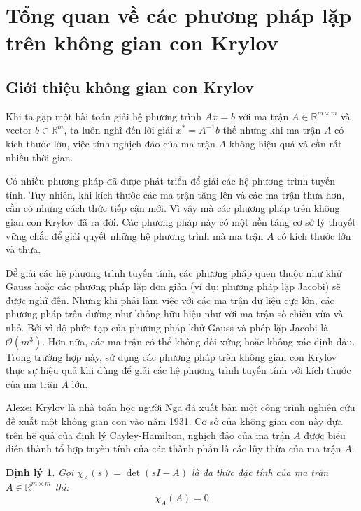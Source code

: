 \documentclass[14pt, a4paper]{article}
\numberwithin{equation}{section}
\numberwithin{algorithm}{section}
\numberwithin{figure}{section}
\newtheorem{dl}{Định lý}
\numberwithin{dl}{section}
\numberwithin{md}{section}
\numberwithin{bd}{section}
\numberwithin{dn}{section}
\numberwithin{hq}{section}
\begin{document}
\section{Tổng quan về các phương pháp lặp trên không gian con Krylov}

\subsection{Giới thiệu không gian con Krylov}

Khi ta gặp một bài toán giải hệ phương trình $Ax=b$ với ma trận $A \in \mathbb{R}^{m \times m}$ và vector $b \in \mathbb{R}^m$, ta luôn nghĩ đến lời giải $x^* = A^{-1}b$ thế nhưng khi ma trận $A$ có kích thước lớn, việc tính nghịch đảo của ma trận $A$ không hiệu quả và cần rất nhiều thời gian.

Có nhiều phương pháp đã được phát triển để giải các hệ phương trình tuyến tính. Tuy nhiên, khi kích thước các ma trận tăng lên và các ma trận thưa hơn, cần có những cách thức tiếp cận mới.
Vì vậy mà các phương pháp trên không gian con Krylov đã ra đời. Các phương pháp này có một nền tảng cơ sở lý thuyết vững chắc để giải quyết những hệ phương trình mà ma trận $A$ có kích thước lớn và thưa. 

Để giải các hệ phương trình tuyến tính, các phương pháp quen thuộc như khử Gauss hoặc các phương pháp lặp đơn giản (ví dụ: phương pháp lặp Jacobi) sẽ được nghĩ đến. Nhưng khi phải làm việc với các ma trận dữ liệu cực lớn, các phương pháp trên dường như không hữu hiệu như với ma trận số chiều vừa và nhỏ. Bởi vì độ phức tạp của phương pháp khử Gauss và phép lặp Jacobi là $\mathcal{O}(m^3)$.
Hơn nữa, các ma trận có thể không đối xứng hoặc không xác định dấu. Trong trường hợp này, sử dụng các phương pháp trên không gian con Krylov thực sự hiệu quả khi dùng để giải các hệ phương trình tuyến tính với kích thước của ma trận $A$ lớn.

Alexei Krylov là nhà toán học người Nga đã xuất bản một công trình nghiên cứu \cite{krylov1931numerical} đề xuất một không gian con vào năm 1931. Cơ sở của không gian con này dựa trên hệ quả của định lý Cayley-Hamilton, nghịch đảo của ma trận $A$ được biểu diễn thành tổ hợp tuyến tính của các thành phần là các lũy thừa của ma trận $A$.

\begin{dl}
    Gọi $\chi_{A}(s) = \det(sI - A)$ là đa thức đặc tính của ma trận $A \in \mathbb{R}^{m \times m}$ thì:
    \begin{equation}
        \chi_{A}(A)=0
    \end{equation}
\end{dl}
\end{document}
